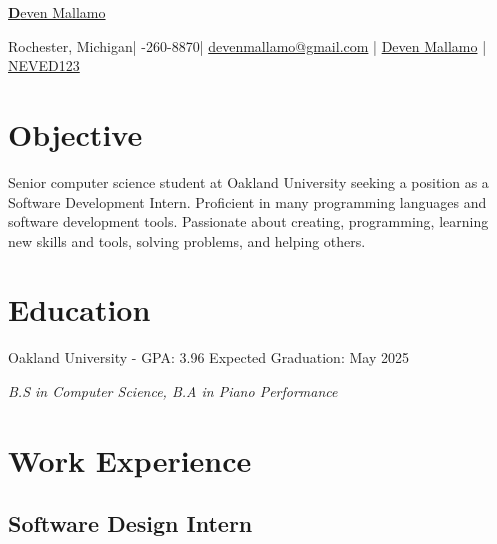 \documentclass{article}
\makeatletter
\newcommand{\resumesection}[1]{
	\section*{\Large\textbf{#1}}
	\hrulefill
	\vspace{1ex}
}
\newcommand{\name}{Deven Mallamo}
\newcommand{\address}{Rochester, Michigan}
\newcommand{\phone}{586-260-8870}
\newcommand{\email}{devenmallamo@gmail.com}
\newcommand{\linkedin}{Deven Mallamo}
\newcommand{\github}{NEVED123}
\makeatother
\begin{document}
\begin{tcolorbox}[colback= boxfill,colframe=boxframe]
	\begin{center}
		\vspace{5pt}
		\href{https://www.devenmallamo.com}{\Huge \textbf \name} 

		\normalsize \vspace{10pt}

		\faHome \space \address \space | 
		\faPhone \space \phone \space |
		\href{mailto:\email}{\faEnvelope \space \email} \space | 
		\href{https://www.linkedin.com/in/deven-mallamo/}{\faLinkedin \space \linkedin} \space | 
		\href{https://github.com/NEVED123}{\faGithub \space \github} 
	\end{center}
\end{tcolorbox}

\vspace{1ex}

\resumesection{Objective}

\vspace{.2ex}	

Senior computer science student at Oakland University seeking a position as a Software Development Intern. Proficient in many programming languages and software development tools. Passionate about creating, programming, \hspace{49152sp}learning new skills and tools, solving problems, and helping others.

\vspace{.5ex}	


\resumesection{Education}

\vspace{.2ex}	

Oakland University - GPA: 3.96 \hfill Expected Graduation: May 2025

\textit {B.S in Computer Science, B.\hspace{49152sp}A in Piano Performance} 

\vspace{.5ex}


\resumesection{Work Experience}

\subsection*{Software Design Intern} 
\end{document}
